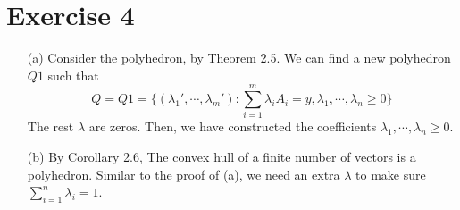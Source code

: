 \documentclass{article}
\begin{document}
\section*{Exercise 4}
\begin{itemize}
	\item[(a)] Consider the polyhedron, by Theorem 2.5. We can find a new polyhedron $Q1$ such that
	$$Q = Q1 = \{(\lambda_1', \cdots, \lambda_m'):\sum_{i=1}^m \lambda_i A_i = y, \lambda_1, \cdots, \lambda_n \geqslant 0\}$$
	The rest $\lambda$ are zeros. Then, we have constructed the coefficients $\lambda_1, \cdots, \lambda_n \geqslant 0$.
	\item[(b)] By Corollary 2.6, The convex hull of a finite number of vectors is a polyhedron. Similar to the proof of (a), we need an extra $\lambda$ to make sure $\sum_{i=1}^n \lambda_i = 1$.
\end{itemize}
\end{document}
